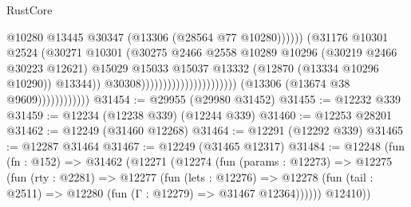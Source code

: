 \begin{lexlean}{RustCore}
\begin{coremodule}
                                                                          @10280
                                                                          @13445
                                                                          @30347
                                                                          (@13306
                                                                            (@28564 @77 @10280))))))
                                                                  (@31176
                                                                    @10301
                                                                    @2524
                                                                    (@30271
                                                                      @10301
                                                                      (@30275
                                                                        @2466
                                                                        @2558
                                                                        @10289
                                                                        @10296
                                                                        (@30219 @2466 @30223 @12621)
                                                                        @15029
                                                                        @15033
                                                                        @15037
                                                                        @13332
                                                                        (@12870
                                                                          (@13334 @10296 @10290))
                                                                        @13344))
                                                                    @30308))))))))))))))))))))))
                        (@13306 (@13674 @38 @9609))))))))))))
@31454 := @29955 (@29980 @31452)
@31455 := @12232 @339
@31459 := @12234 (@12238 @339) (@12244 @339)
@31460 := @12253 @28201
@31462 := @12249 (@31460 @12268)
@31464 := @12291 (@12292 @339)
@31465 := @12287 @31464
@31467 := @12249 (@31465 @12317)
@31484 := @12248
    (fun (fn : @152) =>
    @31462
      (@12271
        (@12274
          (fun (params : @12273) =>
          @12275
            (fun (rty : @2281) =>
            @12277
              (fun (lets : @12276) =>
              @12278 (fun (tail : @2511) => @12280 (fun (Γ : @12279) => @31467 @12364))))))
        @12410))

\end{coremodule}
\end{lexlean}
